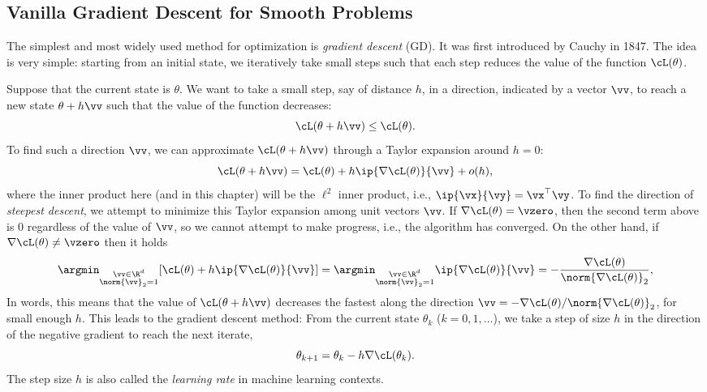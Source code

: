 \documentclass[../../book-main.tex]{subfiles}
\begin{document}
\subsection{Vanilla Gradient Descent for Smooth Problems}

The simplest and most widely used method for optimization is
\textit{gradient descent} (GD). It was first introduced by Cauchy in
1847. The idea is very simple: starting from an initial state, we
iteratively take small steps such that each step reduces the value of
the function \(\cL(\theta)\).

Suppose that the current state is \(\theta\). We want to take a small
step, say of distance \(h\), in a direction, indicated by a vector
\(\vv\), to reach a new state \(\theta + h\vv\) such that the value
of the function decreases:
\begin{equation}
    \cL(\theta + h\vv) \leq \cL(\theta).
\end{equation}
To find such a direction $\vv$, we can approximate $\cL(\theta +
h\vv)$ through a Taylor expansion around \(h = 0\):
\begin{equation}
    \cL(\theta + h\vv) = \cL(\theta) + h\ip{\nabla \cL(\theta)}{\vv} + o(h),
\end{equation}
where the inner product here (and in this chapter) will be the
\(\ell^{2}\) inner product, i.e., \(\ip{\vx}{\vy} = \vx^{\top}\vy\).
To find the direction of \textit{steepest descent}, we attempt to
minimize this Taylor expansion among unit vectors \(\vv\). If
\(\nabla \cL(\theta) = \vzero\), then the second term above is \(0\)
regardless of the value of \(\vv\), so we cannot attempt to make
progress, i.e., the algorithm has converged. On the other hand, if
\(\nabla \cL(\theta) \neq \vzero\) then it holds
\begin{equation}\label{eq:steepest_descent_l2_norm}
    \argmin_{\substack{\vv \in \R^{d} \\ \norm{\vv}_{2} = 1}}
    [\cL(\theta) + h\ip{\nabla \cL(\theta)}{\vv}] =
    \argmin_{\substack{\vv \in \R^{d} \\ \norm{\vv}_{2} = 1}}
    \ip{\nabla \cL(\theta)}{\vv} = -\frac{\nabla
    \cL(\theta)}{\norm{\nabla \cL(\theta)}_{2}},
\end{equation}
In words, this means that the value of \(\cL(\theta + h\vv)\)
decreases the fastest along the direction \(\vv = -\nabla \cL(\theta)
/ \norm{\nabla \cL(\theta)}_{2}\), for small enough \(h\). This leads
to the gradient descent method: From the current state \(\theta_{k}\)
(\(k=0, 1, \ldots\)), we take a step of size \(h\) in the direction
of the negative gradient to reach the next iterate,
\begin{equation}
    \theta_{k+1} = \theta_{k} - h \nabla \cL(\theta_{k}).
\end{equation}
The step size \(h\) is also called the \textit{learning rate} in
machine learning contexts.
\end{document}

